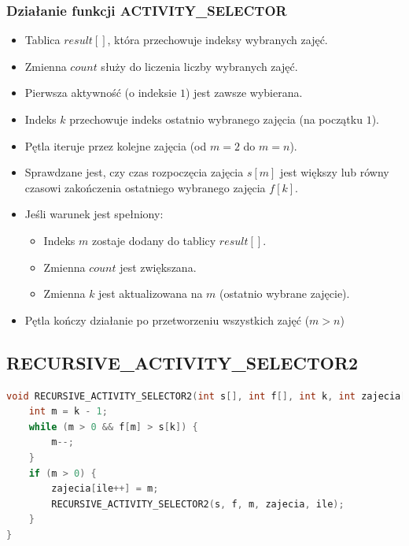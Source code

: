\documentclass{article}
\begin{document}
		\subsubsection*{Działanie funkcji ACTIVITY\_SELECTOR}
		\begin{itemize}
			\item Tablica $result[]$, która przechowuje indeksy wybranych zajęć.
			\item Zmienna $count$ służy do liczenia liczby wybranych zajęć.
			\item Pierwsza aktywność (o indeksie $1$) jest zawsze wybierana. 
			\item Indeks $k$ przechowuje indeks ostatnio wybranego zajęcia (na początku $1$).
			\item Pętla iteruje przez kolejne zajęcia (od $m = 2$ do $m = n$).
			\item Sprawdzane jest, czy czas rozpoczęcia zajęcia $s[m]$ jest większy lub równy czasowi zakończenia ostatniego wybranego zajęcia $f[k]$.
			\item Jeśli warunek jest spełniony:
			\begin{itemize}
				\item Indeks $m$ zostaje dodany do tablicy $result[]$.
				\item Zmienna $count$ jest zwiększana.
				\item Zmienna $k$ jest aktualizowana na $m$ (ostatnio wybrane zajęcie).
			\end{itemize}
			\item Pętla kończy działanie po przetworzeniu wszystkich zajęć ($m > n$)
		\end{itemize}
		
	\subsection*{RECURSIVE\_ACTIVITY\_SELECTOR2} 
\begin{lstlisting}[language=C++, tabsize=3, basicstyle=\footnotesize]
void RECURSIVE_ACTIVITY_SELECTOR2(int s[], int f[], int k, int zajecia[], int &ile) {
	int m = k - 1;
	while (m > 0 && f[m] > s[k]) {
		m--;
	}
	if (m > 0) { 
		zajecia[ile++] = m; 
		RECURSIVE_ACTIVITY_SELECTOR2(s, f, m, zajecia, ile);  
	}
}
	
\end{lstlisting}
		
\end{document}
